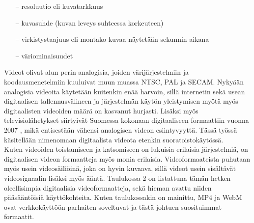 \documentclass[finnish, 12pt, a4paper, elec, utf8, a-1b, online]{aaltothesis}
\begin{document}
\begin{itemize}
  \item[--] resoluutio eli kuvatarkkuus
  \item[--] kuvasuhde (kuvan leveys suhteessa korkeuteen)
  \item[--] virkistystaajuus eli montako kuvaa näytetään sekunnin aikana
  \item[--] väriominaisuudet
\end{itemize}

\noindent Videot olivat alun perin analogisia, joiden värijärjestelmiin ja koodausmenetelmiin kuuluivat muun muassa NTSC, PAL ja SECAM. Nykyään analogisia videoita käytetään kuitenkin enää harvoin, sillä internetin sekä usean digitaalisen tallennusvälineen ja järjestelmän käytön yleistymisen myötä myös digitaalisten videoiden määrä on kasvanut hurjasti. Lisäksi myös televisiolähetykset siirtyivät Suomessa kokonaan digitaaliseen formaattiin vuonna 2007 \cite{Digita}, mikä entisestään vähensi analogisen videon esiintyvyyttä. Tässä työssä käsitellään nimenomaan digitaalista videota etenkin suoratoistokäytössä. \\

\noindent Kuten videoiden toistamiseen ja katsomiseen on lukuisia erilaisia järjestelmiä, on digitaalisen videon formaatteja myös monia erilaisia. Videoformaateista puhutaan myös usein videosäiliöinä, joka on hyvin kuvaava, sillä videot usein sisältävät videosignaalin lisäksi myös ääntä. Taulukossa 2 on listattuna tämän hetken oleellisimpia digitaalisia videoformaatteja, sekä hieman avattu niiden pääsääntöisiä käyttökohteita. Kuten taulukossakin on mainittu, MP4 ja WebM ovat verkkokäyttöön parhaiten soveltuvat ja tästä johtuen suosituimmat formaatit.
\end{document}
